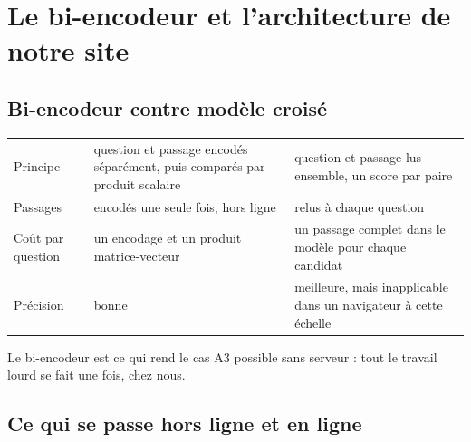 \section{Le bi-encodeur et l'architecture de notre site}

\subsection{Bi-encodeur contre modèle croisé}

\begin{tabletype}
\begin{tabularx}{\textwidth}{@{}L{3.2cm}YY@{}}
\toprule
&  &  \\
\midrule
Principe & question et passage encodés séparément, puis comparés par produit scalaire & question et passage lus ensemble, un score par paire \\
Passages & encodés une seule fois, hors ligne & relus à chaque question \\
Coût par question & un encodage et un produit matrice-vecteur & un passage complet dans le modèle pour chaque candidat \\
Précision & bonne & meilleure, mais inapplicable dans un navigateur à cette échelle \\
\bottomrule
\end{tabularx}
\end{tabletype}

Le bi-encodeur est ce qui rend le cas A3 possible sans serveur : tout le travail lourd se fait une fois, chez nous.

\subsection{Ce qui se passe hors ligne et en ligne}

